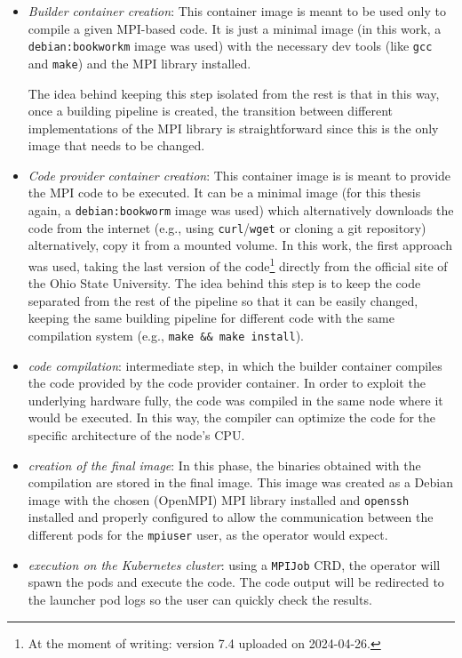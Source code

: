 \begin{itemize}
  \itemsep0em
  \item \textit{Builder container creation}: This container image is meant to be used
    only to compile a given MPI-based code. It is just a minimal image (in this
    work, a \texttt{debian:bookworkm} image was used) with the necessary dev
    tools (like \texttt{gcc} and \texttt{make}) and the MPI library installed.

    The idea behind keeping this step isolated from the rest is that in this way,
    once a building pipeline is created, the transition between different
    implementations of the MPI library is straightforward since this is the only
    image that needs to be changed.

  \item \textit{Code provider container creation}: This container image is is meant to
    provide the MPI code to be executed. It can be a minimal image (for this
    thesis again, a \texttt{debian:bookworm} image was used) which
    alternatively downloads the code from the internet (e.g., using
    \texttt{curl}/\texttt{wget} or cloning a git repository) alternatively, copy
    it from a mounted volume. In this work, the first approach was used, taking
    the last version of the code\footnote{At the moment of writing: version 7.4
      uploaded on 2024-04-26.} directly from the official site of the Ohio State
    University.
    The idea behind this step is to keep the code separated from the rest of the
    pipeline so that it can be easily changed, keeping the same building pipeline
    for different code with the same compilation system (e.g., \texttt{make \&\&
      make install}).

  \item \textit{code compilation}: intermediate step, in which the builder
    container compiles the code provided by the code provider container. In
    order to exploit the underlying hardware fully, the code was compiled in the
    same node where it would be executed. In this way, the
    compiler can optimize the code for the specific architecture of the node's
    CPU.

  \item \textit{creation of the final image}: In this phase, the binaries
    obtained with the compilation are stored in the final image. This image was
    created as a Debian image with the chosen (OpenMPI) MPI library installed
    and \texttt{openssh} installed and properly configured to allow the
    communication between the different pods for the \texttt{mpiuser} user, as
    the operator would expect.

  \item \textit{execution on the Kubernetes cluster}: using a \texttt{MPIJob}
    CRD, the operator will spawn the pods and execute the code. The code output
    will be redirected to the launcher pod logs so the user can quickly check the
    results.
\end{itemize}



